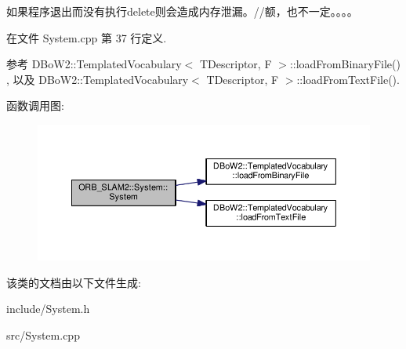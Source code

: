 如果程序退出而没有执行delete则会造成内存泄漏。//额，也不一定。。。。 

在文件 System.\-cpp 第 37 行定义.



参考 D\-Bo\-W2\-::\-Templated\-Vocabulary$<$ T\-Descriptor, F $>$\-::load\-From\-Binary\-File() , 以及 D\-Bo\-W2\-::\-Templated\-Vocabulary$<$ T\-Descriptor, F $>$\-::load\-From\-Text\-File().



函数调用图\-:
\nopagebreak
\begin{figure}[H]
\begin{center}
\leavevmode
\includegraphics[width=350pt]{classORB__SLAM2_1_1System_a687bbabebe054f6d40b44b1ba64bc57a_cgraph}
\end{center}
\end{figure}




该类的文档由以下文件生成\-:\begin{DoxyCompactItemize}
\item 
include/System.\-h\item 
src/System.\-cpp\end{DoxyCompactItemize}
